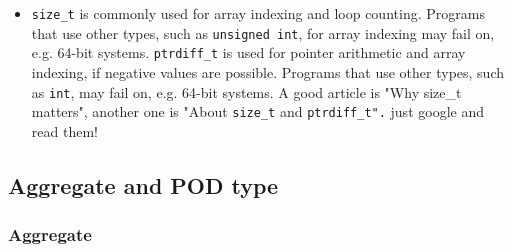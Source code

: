 \documentclass[a4paper,11pt,twoside]{book}
\begin{document}
\begin{itemize}
	\item \texttt{size\_t} is commonly used for array indexing and loop counting. Programs that use other types, such as \texttt{unsigned int}, for array indexing may fail on, e.g. 64-bit systems. \texttt{ptrdiff\_t} is used for pointer arithmetic and array indexing, if negative values are possible. Programs that use other types, such as \texttt{int}, may fail on, e.g. 64-bit systems. A good article is "Why size\_t matters", another one is "About \texttt{size\_t} and \texttt{ptrdiff\_t".} just google and read them!   
\end{itemize}

\subsection{Aggregate and POD type}
\subsubsection{Aggregate}
\end{document}
